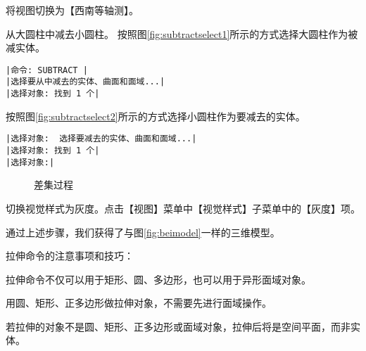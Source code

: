 \begin{procedure}
\item 将视图切换为【西南等轴测】。
\item 从大圆柱中减去小圆柱。
按照图\ref{fig:subtractselect1}所示的方式选择大圆柱作为被减实体。
\begin{lstlisting}
|命令: SUBTRACT |
|选择要从中减去的实体、曲面和面域...|
|选择对象: 找到 1 个|
\end{lstlisting}
按照图\ref{fig:subtractselect2}所示的方式选择小圆柱作为要减去的实体。
\begin{lstlisting}
|选择对象:  选择要减去的实体、曲面和面域...|
|选择对象: 找到 1 个|
|选择对象:|
\end{lstlisting}
\begin{figure}[htbp]
\centering
{}\hspace{20pt}
\caption{差集过程}
\end{figure}
\item 切换视觉样式为灰度。点击【视图】菜单中【视觉样式】子菜单中的【灰度】项。
\end{procedure}

通过上述步骤，我们获得了与图\ref{fig:beimodel}一样的三维模型。

拉伸命令的注意事项和技巧：
\begin{tips}
\item 拉伸命令不仅可以用于矩形、圆、多边形，也可以用于异形面域对象。
\item 用圆、矩形、正多边形做拉伸对象，不需要先进行面域操作。
\item 若拉伸的对象不是圆、矩形、正多边形或面域对象，拉伸后将是空间平面，而非实体。
\end{tips}
\endinput